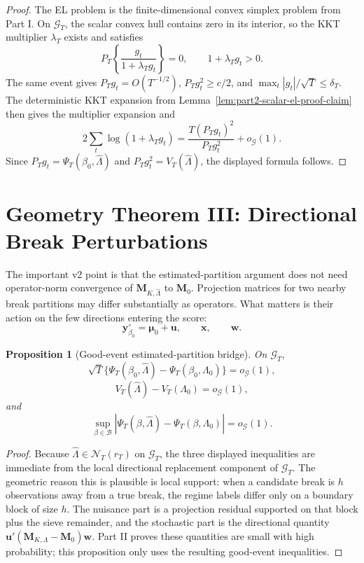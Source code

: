 \documentclass[12pt]{article}
\numberwithin{equation}{section}
\newtheorem{proposition}{Proposition}
\theoremstyle{definition}
\begin{document}
\begin{proof}
The EL problem is the finite-dimensional convex simplex problem from Part I.
On \(\mathcal G_T\), the scalar convex hull contains zero in its interior, so the
KKT multiplier \(\lambda_T\) exists and satisfies
\[
    P_T\left\{\frac{g_t}{1+\lambda_Tg_t}\right\}=0,
    \qquad 1+\lambda_Tg_t>0.
\]
The same event gives \(P_Tg_t=O(T^{-1/2})\),
\(P_Tg_t^2\ge c/2\), and \(\max_t|g_t|/\sqrt T\le\delta_T\). The deterministic
KKT expansion from Lemma~\ref{lem:part2-scalar-el-proof-claim} then gives the
multiplier expansion and
\[
    2\sum_t\log(1+\lambda_Tg_t)
    =\frac{T(P_Tg_t)^2}{P_Tg_t^2}+o_{\mathcal G}(1).
\]
Since \(P_Tg_t=\Psi_T(\beta_0,\widehat\Lambda)\) and
\(P_Tg_t^2=V_T(\widehat\Lambda)\), the displayed formula follows.
\end{proof}

\section{Geometry Theorem III: Directional Break Perturbations}

The important v2 point is that the estimated-partition argument does not need
operator-norm convergence of \(\bm M_{K,\widehat\Lambda}\) to \(\bm M_0\).
Projection matrices for two nearby break partitions may differ substantially as
operators. What matters is their action on the few directions entering the
score:
\[
    \bm y_{\beta_0}^\circ=\bm\mu_0+\bm u,
    \qquad \bm x,
    \qquad \bm w.
\]

\begin{proposition}[Good-event estimated-partition bridge]
\label{prop:v2-good-event-break-bridge}
On \(\mathcal G_T\),
\[
    \sqrt T\{\Psi_T(\beta_0,\widehat\Lambda)
      -\Psi_T(\beta_0,\Lambda_0)\}=o_{\mathcal G}(1),
\]
\[
    V_T(\widehat\Lambda)-V_T(\Lambda_0)=o_{\mathcal G}(1),
\]
and
\[
    \sup_{\beta\in\mathcal B}
    |\Psi_T(\beta,\widehat\Lambda)-\Psi_T(\beta,\Lambda_0)|=o_{\mathcal G}(1).
\]
\end{proposition}

\begin{proof}
Because \(\widehat\Lambda\in\mathcal N_T(r_T)\) on \(\mathcal G_T\), the three
displayed inequalities are immediate from the local directional replacement
component of \(\mathcal G_T\). The geometric reason this is plausible is local
support: when a candidate break is \(h\) observations away from a true break,
the regime labels differ only on a boundary block of size \(h\). The nuisance
part is a projection residual supported on that block plus the sieve remainder,
and the stochastic part is the directional quantity
\(\bm u'(\bm M_{K,\Lambda}-\bm M_0)\bm w\). Part II proves these quantities are
small with high probability; this proposition only uses the resulting good-event
inequalities.
\end{proof}
\end{document}
